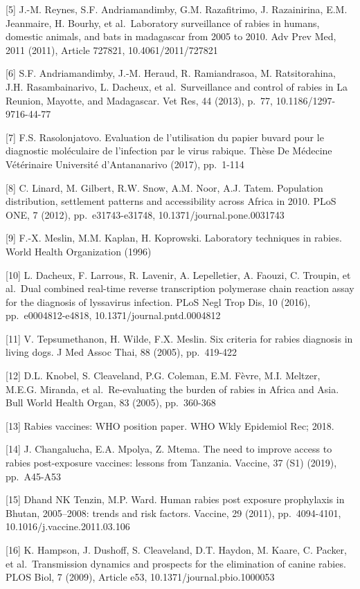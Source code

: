 \documentclass[
]{book}
\begin{document}
{[}5{]} J.-M. Reynes, S.F. Andriamandimby, G.M. Razafitrimo, J. Razainirina, E.M. Jeanmaire, H. Bourhy, et al.~Laboratory surveillance of rabies in humans, domestic animals, and bats in madagascar from 2005 to 2010. Adv Prev Med, 2011 (2011), Article 727821, 10.4061/2011/727821

{[}6{]} S.F. Andriamandimby, J.-M. Heraud, R. Ramiandrasoa, M. Ratsitorahina, J.H. Rasambainarivo, L. Dacheux, et al.~Surveillance and control of rabies in La Reunion, Mayotte, and Madagascar. Vet Res, 44 (2013), p.~77, 10.1186/1297-9716-44-77

{[}7{]} F.S. Rasolonjatovo. Evaluation de l'utilisation du papier buvard pour le diagnostic moléculaire de l'infection par le virus rabique. Thèse De Médecine Vétérinaire Université d'Antananarivo (2017), pp.~1-114

{[}8{]} C. Linard, M. Gilbert, R.W. Snow, A.M. Noor, A.J. Tatem. Population distribution, settlement patterns and accessibility across Africa in 2010. PLoS ONE, 7 (2012), pp.~e31743-e31748, 10.1371/journal.pone.0031743

{[}9{]} F.-X. Meslin, M.M. Kaplan, H. Koprowski. Laboratory techniques in rabies. World Health Organization (1996)

{[}10{]} L. Dacheux, F. Larrous, R. Lavenir, A. Lepelletier, A. Faouzi, C. Troupin, et al.~Dual combined real-time reverse transcription polymerase chain reaction assay for the diagnosis of lyssavirus infection. PLoS Negl Trop Dis, 10 (2016), pp.~e0004812-e4818, 10.1371/journal.pntd.0004812

{[}11{]} V. Tepsumethanon, H. Wilde, F.X. Meslin. Six criteria for rabies diagnosis in living dogs. J Med Assoc Thai, 88 (2005), pp.~419-422

{[}12{]} D.L. Knobel, S. Cleaveland, P.G. Coleman, E.M. Fèvre, M.I. Meltzer, M.E.G. Miranda, et al.~Re-evaluating the burden of rabies in Africa and Asia. Bull World Health Organ, 83 (2005), pp.~360-368

{[}13{]} Rabies vaccines: WHO position paper. WHO Wkly Epidemiol Rec; 2018.

{[}14{]} J. Changalucha, E.A. Mpolya, Z. Mtema. The need to improve access to rabies post-exposure vaccines: lessons from Tanzania. Vaccine, 37 (S1) (2019), pp.~A45-A53

{[}15{]} Dhand NK Tenzin, M.P. Ward. Human rabies post exposure prophylaxis in Bhutan, 2005--2008: trends and risk factors. Vaccine, 29 (2011), pp.~4094-4101, 10.1016/j.vaccine.2011.03.106

{[}16{]} K. Hampson, J. Dushoff, S. Cleaveland, D.T. Haydon, M. Kaare, C. Packer, et al.~Transmission dynamics and prospects for the elimination of canine rabies. PLOS Biol, 7 (2009), Article e53, 10.1371/journal.pbio.1000053
\end{document}
